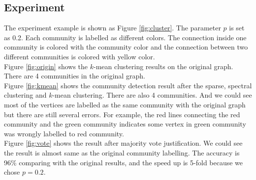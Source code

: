 \subsection{Experiment}
The experiment example is shown as Figure \ref{fig:cluster}. The parameter $p$ is set as 0.2. Each community is labelled as different colors. The connection inside one community is colored with the community color and the connection between two different communities is colored with yellow color. \\
Figure \ref{fig:origin} shows the $k$-mean clustering results on the original graph. There are 4 communities in the original graph. \\
Figure \ref{fig:kmean} shows the community detection result after the sparse, spectral clustering and $k$-mean clustering. There are also 4 communities. And we could see most of the vertices are labelled as the same community with the original graph but there are still several errors. For example, the red lines connecting the red community and the green community indicates some vertex in green community was wrongly labelled to red community. \\
Figure \ref{fig:vote} shows the result after majority vote justification. We could see the result is almost same as the original community labelling. The accuracy is 96\% comparing with the original results, and the speed up is 5-fold because we chose $p = 0.2$.
